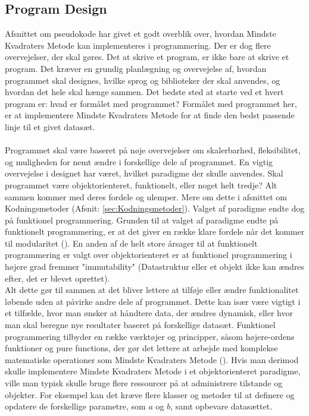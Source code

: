 \subsection{Program Design}\label{sec:programDesign}
Afsnittet om pseudokode har givet et godt overblik over, hvordan Mindste Kvadraters Metode kan implementeres i programmering. Der er dog flere overvejelser, der skal gøres. Det at skrive et program, er ikke bare at skrive et program. Det kræver en grundig planlægning og overvejelse af, hvordan programmet skal designes, hvilke sprog og biblioteker der skal anvendes, og hvordan det hele skal hænge sammen. Det bedste sted at starte ved et hvert program er: hvad er formålet med programmet? Formålet med programmet her, er at implementere Mindste Kvadraters Metode for at finde den bedst passende linje til et givet datasæt. \\\\ Programmet skal være baseret på nøje overvejelser om skalerbarhed, fleksibilitet, og muligheden for nemt ændre i forskellige dele af programmet. En vigtig overvejelse i designet har været, hvilket paradigme der skulle anvendes. Skal programmet være objektorienteret, funktionelt, eller noget helt tredje? Alt sammen kommer med deres fordele og ulemper. Mere om dette i afsnittet om Kodningsmetoder (Afsnit: \ref{sec:Kodningsmetoder}). Valget af paradigme endte dog på funktionel programmering. Grunden til at valget af paradigme endte på funktionelt programmering, er at det giver en række klare fordele når det kommer til modularitet (\cite{gupta}). En anden af de helt store årsager til at funktionelt programmering er valgt over objektorienteret er at funktionel programmering i højere grad fremmer "immutability" (Datastruktur eller et objekt ikke kan ændres efter, det er blevet oprettet). \\ Alt dette gør til sammen at det bliver lettere at tilføje eller ændre funktionalitet løbende uden at påvirke andre dele af programmet. Dette kan især være vigtigt i et tilfælde, hvor man ønsker at håndtere data, der ændres dynamisk, eller hvor man skal beregne nye resultater baseret på forskellige datasæt. Funktionel programmering tilbyder en række værktøjer og principper, såsom højere-ordens funktioner og pure functions, der gør det lettere at arbejde med komplekse matematiske operationer som Mindste Kvadraters Metode (\cite{funktionelProgrammering}). Hvis man derimod skulle implementere Mindste Kvadraters Metode i et objektorienteret paradigme, ville man typisk skulle bruge flere ressourcer på at administrere tilstande og objekter. For eksempel kan det kræve flere klasser og metoder til at definere og opdatere de forskellige parametre, som  $a$ og $b$, samt opbevare datasættet. \\  
